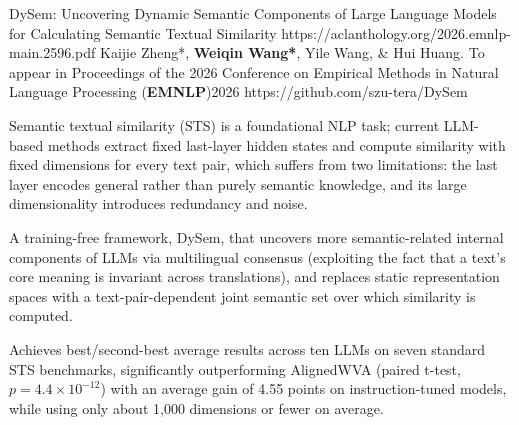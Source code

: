 \pub
  {DySem: Uncovering Dynamic Semantic Components of Large Language Models for Calculating Semantic Textual Similarity}
  {https://aclanthology.org/2026.emnlp-main.2596.pdf}
  {Kaijie Zheng*, \textbf{Weiqin Wang*}, Yile Wang, \& Hui Huang.}
  {To appear in Proceedings of the 2026 Conference on Empirical Methods in Natural Language Processing (\textbf{EMNLP})}{2026}
  {https://github.com/szu-tera/DySem}
\begin{pubnotes}
  \item {}Semantic textual similarity (STS) is a foundational NLP task; current LLM-based methods extract fixed last-layer hidden states and compute similarity with fixed dimensions for every text pair, which suffers from two limitations: the last layer encodes general rather than purely semantic knowledge, and its large dimensionality introduces redundancy and noise.
  \item {}A training-free framework, DySem, that uncovers more semantic-related internal components of LLMs via multilingual consensus (exploiting the fact that a text's core meaning is invariant across translations), and replaces static representation spaces with a text-pair-dependent joint semantic set over which similarity is computed.
  \item {}Achieves best/second-best average results across ten LLMs on seven standard STS benchmarks, significantly outperforming AlignedWVA (paired t-test, $p=4.4\times10^{-12}$) with an average gain of 4.55 points on instruction-tuned models, while using only about 1,000 dimensions or fewer on average.
\end{pubnotes}

